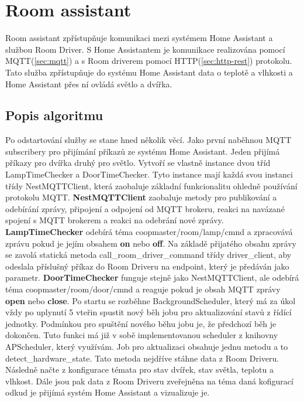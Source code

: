 \section{Room assistant}\label{sec:room-assistant}

Room assistant zpřístupňuje komunikaci mezi systémem Home Assistant a službou Room Driver.\newline
S Home Assistantem je komunikace realizována pomocí MQTT(\ref{sec:mqtt}) a s Room driverem pomocí HTTP(\ref{sec:http-rest}) protokolu.
Tato služba zpřístupňuje do systému Home Assistant data o teplotě a vlhkosti a Home Assistant přes ní ovládá světlo a dvířka.

\subsection*{Popis algoritmu}
Po odstartování služby se stane hned několik věcí.
Jako první naběhnou MQTT subscribery pro přijímání příkazů ze systému Home Assistant.
Jeden přijímá příkazy pro dvířka druhý pro světlo.
Vytvoří se vlastně instance dvou tříd LampTimeChecker a DoorTimeChecker.
Tyto instance mají každá svou instanci třídy NestMQTTClient, která zaobaluje základní funkcionalitu ohledně používání protokolu MQTT.\newline
\textbf{NestMQTTClient} zaobaluje metody pro publikování a odebírání zprávy, připojení a odpojení od MQTT brokeru, reakci na navázané spojení s MQTT brokerem a reakci na odebrání nové zprávy.\newline
\textbf{LampTimeChecker} odebírá téma coopmaster/room/lamp/cmnd a zpracovává zprávu pokud je jejím obsahem \textbf{on} nebo \textbf{off}.
Na základě přijatého obsahu zprávy se zavolá statická metoda call\_room\_driver\_command třídy driver\_client, aby odeslala příslušný příkaz do Room Driveru na endpoint, který je předáván jako parametr.\newline
\textbf{DoorTimeChecker} funguje stejně jako NestMQTTClient, ale odebírá téma coopmaster/room/door/cmnd a reaguje pokud je obsah MQTT zprávy \textbf{open} nebo \textbf{close}.\newline
Po startu se rozběhne BackgroundScheduler, který má za úkol vždy po uplynutí 5 vteřin spustit nový běh jobu pro aktualizování stavů z řídící jednotky.
Podmínkou pro spuštění nového běhu jobu je, že předchozí běh je dokončen.
Tuto funkci má již v sobě implementovanou scheduler z knihovny APScheduler, který využívám.
Job pro aktualizaci obsahuje jednu metodu a to detect\_hardware\_state.
Tato metoda nejdříve stáhne data z Room Driveru.
Následně načte z konfigurace témata pro stav dvířek, stav světla, teplotu a vlhkost.
Dále jsou pak data z Room Driveru zveřejněna na téma daná kofigurací odkud je přijímá systém Home Assistant a vizualizuje je.

